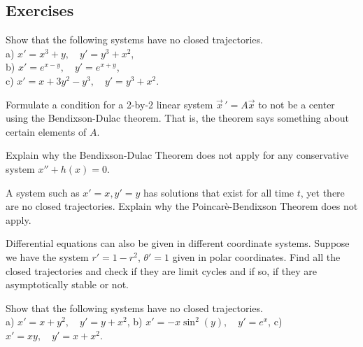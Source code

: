 \documentclass[12pt]{book}
\begin{document}
\subsection{Exercises}

\begin{exercise}
Show that the following systems have no closed trajectories. \\
a) $x'=x^3+y,\quad y'=y^3+x^2$, \\
b) $x'=e^{x-y},\quad y'=e^{x+y}$, \\
c) $x'=x+3y^2-y^3,\quad y'=y^3+x^2$.
\end{exercise}

\begin{exercise}
Formulate a condition for a 2-by-2 linear system
${\vec{x}\,}' = A \vec{x}$ to not be a center using the Bendixson-Dulac theorem.
That is, the theorem says something about certain elements of $A$.
\end{exercise}

\begin{exercise}
Explain why the Bendixson-Dulac Theorem does not apply for any conservative
system $x''+h(x) = 0$.
\end{exercise}

\begin{exercise}
A system such as $x'=x, y'=y$ has solutions that exist for all time $t$,
yet there are no closed trajectories.  Explain
why the Poincar\`e-Bendixson Theorem does not apply.
\end{exercise}

\begin{exercise}
Differential equations can also be given in different coordinate systems.  
Suppose we have the system $r' = 1-r^2$, $\theta' = 1$ given
in polar coordinates.  Find all the closed trajectories and check if they
are limit cycles and if so, if they are asymptotically stable or not.
\end{exercise}


\setcounter{exercise}{100}

\begin{exercise}
Show that the following systems have no closed trajectories. \\
a) $x'=x+y^2,\quad y'=y+x^2$, \qquad
b) $x'=-x\sin^2(y),\quad y'=e^x$, \qquad
c) $x'=xy,\quad y'=x+x^2$.
\end{exercise}
\end{document}
